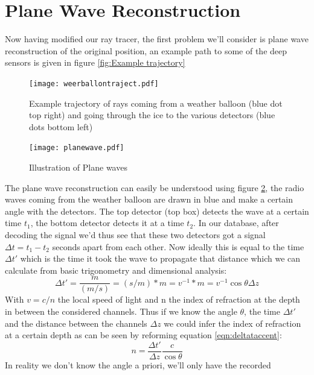 \section{Plane Wave Reconstruction}
Now having modified our ray tracer, the first problem we'll consider is
plane wave reconstruction of the original position, an example path
to some of the deep sensors is given in figure \ref{fig:Example
trajectory}
\begin{figure}
	\centering
	\texttt{[image: weerballontraject.pdf]}
	\caption{Example trajectory of rays coming from a weather balloon (blue dot top right) and going through the ice to the various detectors (blue dots bottom left)}
	\label{fig:Example trajectory}
\end{figure}
\begin{figure}
	\centering
	\texttt{[image: planewave.pdf]}
	\caption{Illustration of Plane waves}	
	\label{fig:Plane Wave}
\end{figure}
The plane wave reconstruction can easily be understood using figure
\ref{fig:Plane Wave}, the radio waves coming from the weather balloon are drawn
in blue and make a certain angle with the detectors. The top detector (top box)
detects the wave at a certain time $t_1$, the bottom detector detects it at a
time $t_2$. In our database, after decoding the signal we'd thus see that these
two detectors got a signal $\Delta t = t_1 - t_2$ seconds apart from each other.
Now ideally this is equal to the time $\Delta t'$ which is the time it took the
wave to propagate that distance which we can calculate from basic trigonometry
and dimensional analysis:
\begin{equation}
	\Delta t' = \frac{m}{(m/s)} = (s/m)*m = v^{-1} * m = v^{-1} \cos\theta \Delta z
	\label{eqn:deltataccent}
\end{equation}
With $v = c/n$ the local speed of light and n the index of refraction at the depth in between
the considered channels. 
Thus if we know the angle $\theta$, the time $\Delta t'$ and the distance between the channels $\Delta z$
we could infer the index of refraction at a certain depth as can be seen by reforming equation \ref{eqn:deltataccent}:
\begin{equation}
	n = \frac{\Delta t'}{\Delta z} \frac{c}{\cos\theta}
\end{equation}
In reality we don't know the angle a priori, we'll only have the recorded
